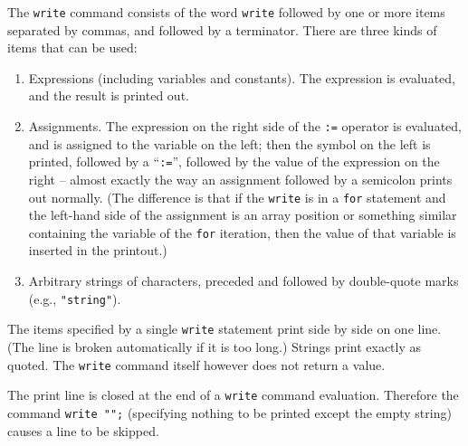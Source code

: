 The \texttt{write} command consists of the word \texttt{write} followed by one
or more items separated by commas, and followed by a terminator.  There
are three kinds of items that can be used:
\begin{enumerate}
\item Expressions (including variables and constants).  The expression is
evaluated, and the result is printed out.

\item Assignments.  The expression on the right side of the \texttt{:=}
operator is evaluated, and is assigned to the variable on the left; then
the symbol on the left is printed, followed by a ``\texttt{:=}'', followed by
the value of the expression on the right -- almost exactly the way an
assignment followed by a semicolon prints out normally. (The difference is
that if the \texttt{write} is in a \texttt{for} statement and the left-hand side
of the assignment is an array position or something similar containing the
variable of the \texttt{for} iteration, then the value of that variable is
inserted in the printout.)

\item Arbitrary strings of characters, preceded and followed by double-quote
marks (e.g., \texttt{"string"}).
\end{enumerate}
The items specified by a single \texttt{write} statement print side by side
on one line. (The line is broken automatically if it is too long.) Strings
print exactly as quoted.  The \texttt{write} command itself however does not
return a value.

The print line is closed at the end of a \texttt{write} command evaluation.
Therefore the command \texttt{write "";} (specifying nothing to be printed
except the empty string) causes a line to be skipped.

